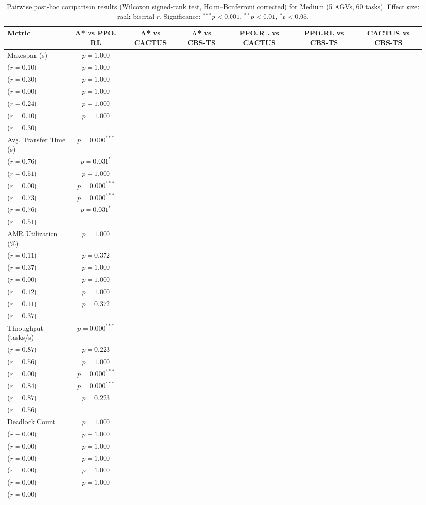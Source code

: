 \begin{table}[htbp]
\centering
\caption{Pairwise post-hoc comparison results (Wilcoxon signed-rank test, Holm--Bonferroni corrected) for Medium (5 AGVs, 60 tasks). Effect size: rank-biserial $r$. Significance: ${}^{***}p<0.001$, ${}^{**}p<0.01$, ${}^{*}p<0.05$.}
\label{tab:significance}
\small
\begin{tabular}{@{}lcccccc@{}}
\toprule
\textbf{Metric} & \textbf{A* vs PPO-RL} & \textbf{A* vs CACTUS} & \textbf{A* vs CBS-TS} & \textbf{PPO-RL vs CACTUS} & \textbf{PPO-RL vs CBS-TS} & \textbf{CACTUS vs CBS-TS} \\
\midrule
Makespan (s) & $p=1.000$\\($r=0.10$) & $p=1.000$\\($r=0.30$) & $p=1.000$\\($r=0.00$) & $p=1.000$\\($r=0.24$) & $p=1.000$\\($r=0.10$) & $p=1.000$\\($r=0.30$) \\
Avg. Transfer Time (s) & $p=0.000^{***}$\\($r=0.76$) & $p=0.031^{*}$\\($r=0.51$) & $p=1.000$\\($r=0.00$) & $p=0.000^{***}$\\($r=0.73$) & $p=0.000^{***}$\\($r=0.76$) & $p=0.031^{*}$\\($r=0.51$) \\
AMR Utilization (\%) & $p=1.000$\\($r=0.11$) & $p=0.372$\\($r=0.37$) & $p=1.000$\\($r=0.00$) & $p=1.000$\\($r=0.12$) & $p=1.000$\\($r=0.11$) & $p=0.372$\\($r=0.37$) \\
Throughput (tasks/s) & $p=0.000^{***}$\\($r=0.87$) & $p=0.223$\\($r=0.56$) & $p=1.000$\\($r=0.00$) & $p=0.000^{***}$\\($r=0.84$) & $p=0.000^{***}$\\($r=0.87$) & $p=0.223$\\($r=0.56$) \\
Deadlock Count & $p=1.000$\\($r=0.00$) & $p=1.000$\\($r=0.00$) & $p=1.000$\\($r=0.00$) & $p=1.000$\\($r=0.00$) & $p=1.000$\\($r=0.00$) & $p=1.000$\\($r=0.00$) \\

\end{tabular}
\end{table}
